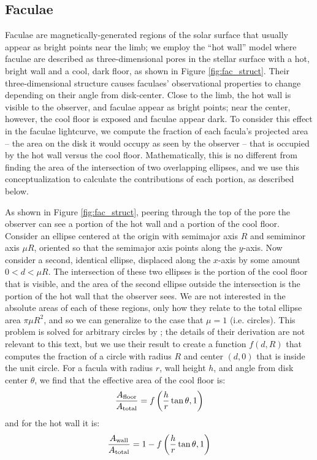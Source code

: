 \documentclass[twocolumn]{aastex631}
\begin{document}
\subsection{Faculae \label{subsec:faculae}}
Faculae are magnetically-generated regions of the solar surface that usually appear as bright points near the limb; we employ the ``hot wall''
model \citep{spruit1976} where faculae are described as three-dimensional pores in the stellar surface with a hot, bright wall and a cool, dark floor, as shown in Figure \ref{fig:fac_struct}. Their three-dimensional structure causes faculaes' observational properties to change depending on their angle from disk-center. Close to the limb,
the hot wall is visible to the observer, and faculae appear as bright points; near the center, however, the cool floor is exposed and faculae appear dark. To consider this effect in the faculae lightcurve, we compute the fraction of each facula's projected area -- the area on the disk it would occupy as seen by the observer -- that is occupied by the hot wall versus the cool floor. Mathematically, this is no different from finding the area of the intersection of two overlapping ellipses, and we use this conceptualization to calculate the contributions of each portion, as described below.

As shown in Figure \ref{fig:fac_struct}, peering through the top of the pore the observer can see a portion of the hot wall and a portion of the cool floor. Consider an ellipse centered at the origin with semimajor axis $R$ and semiminor axis $\mu R$, oriented so that the semimajor axis points along the $y$-axis. Now consider a second, identical ellipse, displaced along the $x$-axis by some amount $0<d<\mu R$. The intersection of these two ellipses is the portion of the cool floor that is visible, and the area of the second ellipse outside the intersection is the portion of the hot wall that the observer sees. We are not interested in the absolute areas of each of these regions, only how they relate to the total ellipse area $\pi \mu R^2$, and so we can generalize to the case that $\mu=1$ (i.e. circles). This problem is solved for arbitrary circles by \citet{weisstein2004}; the details of their derivation are not relevant to this text, but we use their result to create a function $f(d,R)$ that computes the fraction of a circle with radius $R$ and center $(d,0)$ that is inside the unit circle. For a facula with radius $r$, wall height $h$, and angle from disk center $\theta$, we find that the effective area of the cool floor is:
\begin{equation}
    \frac{A_{\rm floor}}{A_{\rm total}} = f\left(\frac{h}{r}\tan{\theta}, 1 \right)
\end{equation}
and for the hot wall it is:
\begin{equation}
    \frac{A_{\rm wall}}{A_{\rm total}} = 1-  f\left(\frac{h}{r}\tan{\theta}, 1 \right)
\end{equation}
\end{document}
